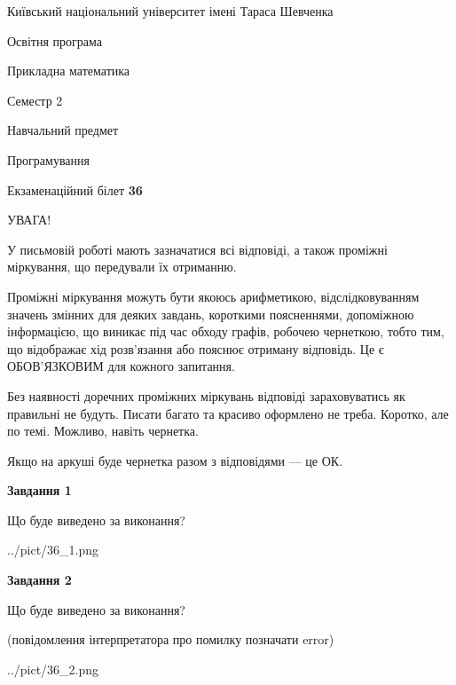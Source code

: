 \documentclass[12pt, ukrainian]{article}
\begin{document}
{{\begin {small}\par
{ \center  Київський національний університет імені Тараса Шевченка \par}
{\parbox {5 cm}{Освітня програма \hfill}{\parbox {7 cm}{Прикладна математика\hfill}}\parbox {6 cm}{\hfill Семестр 2}}\par
{\parbox {5 cm} {Навчальний предмет \hfill}\parbox {7 cm}{Програмування \hfill}\parbox {6cm}{\hfill}\par}\vspace{-7pt} \end{small}}{\center Екзаменаційний білет \No \textbf
{ 36 }\par}}
{
\begin {large}
УВАГА!

У письмовій роботі мають зазначатися всі відповіді, а також проміжні міркування, що передували їх отриманню.

Проміжні міркування можуть бути якоюсь арифметикою, відслідковуванням зна\-чень змінних для деяких завдань,
короткими поясненнями, допоміжною інформацією, що виникає під час обходу графів, робочею чернеткою,
тобто тим, що відображає хід розв’язання або пояснює отриману відповідь.
Це є ОБОВ’ЯЗКОВИМ для кожного запитання.

Без наявності доречних проміжних міркувань відповіді зараховуватись як правиль\-ні не будуть.
Писати багато та красиво оформлено не треба. Коротко, але по темі. Можли\-во, навіть чернетка.

Якщо на аркуші буде чернетка разом з відповідями --- це ОК.

\newpage

{\begin {center}\textbf{Завдання 1}\end {center}}\par
Що буде виведено за виконання?\par
\begin{center}
	{../pict/36_1.png}
\end{center}
\newpage

{\begin {center}\textbf{Завдання 2}\end {center}}\par
Що буде виведено за виконання?\par
 (повідомлення інтерпретатора про помилку позначати error)\par
\begin{center}
	{../pict/36_2.png}
\end{center}
\newpage


\end{large}}
\end{document}

